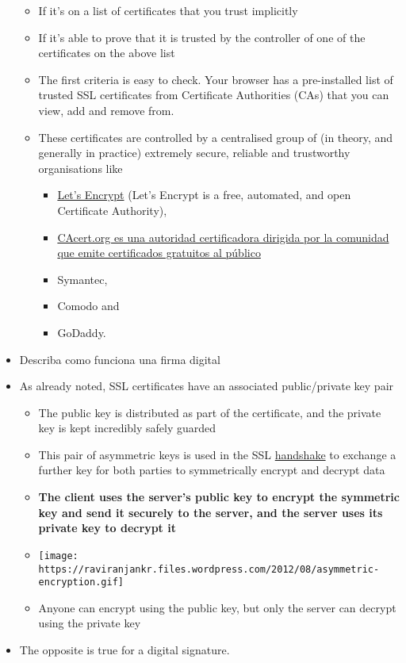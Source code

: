 \begin{itemize}
  \begin{itemize}
  \itemsep1pt\parskip0pt
  \item
    If it's on a list of certificates that you trust implicitly
  \item
    If it's able to prove that it is trusted by the controller of one of
    the certificates on the above list
  \item
    The first criteria is easy to check. Your browser has a
    pre-installed list of trusted SSL certificates from Certificate
    Authorities (CAs) that you can view, add and remove from.
  \item
    These certificates are controlled by a centralised group of (in
    theory, and generally in practice) extremely secure, reliable and
    trustworthy organisations like

    \begin{itemize}
    \itemsep1pt\parskip0pt
    \item
      \href{https://letsencrypt.org/}{Let's Encrypt} (Let's Encrypt is a
      free, automated, and open Certificate Authority),
    \item
      \href{http://www.cacert.org/}{CAcert.org es una autoridad
      certificadora dirigida por la comunidad que emite certificados
      gratuitos al público}
    \item
      Symantec,
    \item
      Comodo and
    \item
      GoDaddy.
    \end{itemize}
  \end{itemize}
\item
  Describa como funciona una firma digital
\item
  As already noted, SSL certificates have an associated public/private
  key pair

  \begin{itemize}
  \itemsep1pt\parskip0pt
  \item
    The public key is distributed as part of the certificate, and the
    private key is kept incredibly safely guarded
  \item
    This pair of asymmetric keys is used in the SSL
    \href{http://www.dictionary.com/browse/handshake}{handshake} to
    exchange a further key for both parties to symmetrically encrypt and
    decrypt data
  \item
    \textbf{The client uses the server's public key to encrypt the
    symmetric key and send it securely to the server, and the server
    uses its private key to decrypt it}
  \item
    \texttt{[image: https://raviranjankr.files.wordpress.com/2012/08/asymmetric-encryption.gif]}
  \item
    Anyone can encrypt using the public key, but only the server can
    decrypt using the private key
  \end{itemize}
\item
  The opposite is true for a digital signature.


\end{itemize}
